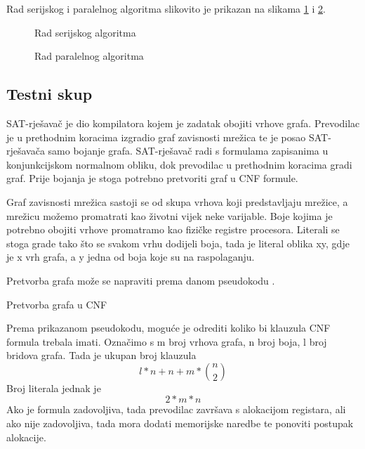 \documentclass[hidelinks, conference]{IEEEtran}
\begin{document}
Rad serijskog i paralelnog algoritma slikovito je prikazan na slikama \ref{fig3} i \ref{fig4}.

\begin{figure}[ht]
\centerline{}
\caption{Rad serijskog algoritma}
\label{fig3}
\end{figure}

\begin{figure}[ht]
\centerline{}
\caption{Rad paralelnog algoritma}
\label{fig4}
\end{figure}

\subsection{Testni skup}
SAT-rješavač je dio kompilatora kojem je zadatak obojiti vrhove grafa. Prevodilac je u prethodnim koracima izgradio graf zavisnosti mrežica te je posao SAT-rješavača samo bojanje grafa. SAT-rješavač radi s formulama zapisanima u konjunkcijskom normalnom obliku, dok prevodilac u prethodnim koracima gradi graf. Prije bojanja je stoga potrebno pretvoriti graf u CNF formule.

Graf zavisnosti mrežica sastoji se od skupa vrhova koji predstavljaju mrežice, a mrežicu možemo promatrati kao životni vijek neke varijable. Boje kojima je potrebno obojiti vrhove promatramo kao fizičke registre procesora. Literali se stoga grade tako što se svakom vrhu dodijeli boja, tada je literal oblika xy, gdje je x vrh grafa, a y jedna od boja koje su na raspolaganju. 

Pretvorba grafa može se napraviti prema danom pseudokodu \cite{b4}.

\begin{algorithm}
\caption{Pretvorba grafa u CNF}\label{alg:two}
\end{algorithm}


Prema prikazanom pseudokodu, moguće je odrediti koliko bi klauzula CNF formula trebala imati. Označimo s m broj vrhova grafa, n broj boja, l broj bridova grafa. Tada je ukupan broj klauzula \begin{equation}
    l*n+n+m*\binom{n}{2}
\end{equation} Broj literala jednak je \begin{equation}
    2*m*n
\end{equation} Ako je formula zadovoljiva, tada prevodilac završava s alokacijom registara, ali ako nije zadovoljiva, tada mora dodati memorijske naredbe te ponoviti postupak alokacije.
\end{document}
